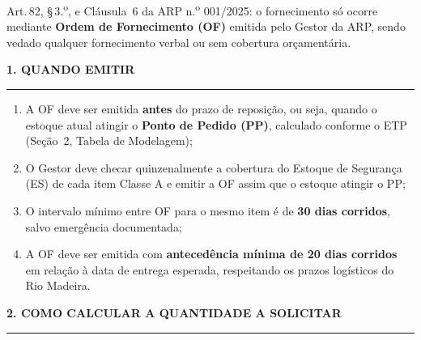 \documentclass[12pt,a4paper]{article}
\newcommand{\blank}[1]{\underline{\hspace{#1}}}
\newcommand{\arpRef}{ARP n.\textsuperscript{o} 001/2025}
\begin{document}
\vspace{0.4cm}
\begin{legalbox}[Fundamento]
\small Art.\,82, \S\,3.\textsuperscript{o}, e Cláusula~6 da \arpRef:
o fornecimento só ocorre mediante \textbf{Ordem de Fornecimento (OF)} emitida
pelo Gestor da ARP, sendo vedado qualquer fornecimento verbal ou sem cobertura
orçamentária.
\end{legalbox}

\vspace{0.5cm}
{\color{navy}\bfseries\normalsize 1. QUANDO EMITIR}\\[6pt]
\textcolor{navy!20}{\rule{\linewidth}{0.4pt}}

\begin{enumerate}
  \item A OF deve ser emitida \textbf{antes} do prazo de reposição, ou seja,
    quando o estoque atual atingir o \textbf{Ponto de Pedido (PP)}, calculado
    conforme o ETP \blank{2cm} (Seção~2, Tabela de Modelagem);

  \item O Gestor deve checar quinzenalmente a cobertura do Estoque de Segurança
    (ES) de cada item Classe A e emitir a OF assim que o estoque atingir o PP;

  \item O intervalo mínimo entre OF para o mesmo item é de \textbf{30 dias
    corridos}, salvo emergência documentada;

  \item A OF deve ser emitida com \textbf{antecedência mínima de 20 dias corridos}
    em relação à data de entrega esperada, respeitando os prazos logísticos do
    Rio Madeira.
\end{enumerate}

\vspace{0.4cm}
{\color{navy}\bfseries\normalsize 2. COMO CALCULAR A QUANTIDADE A SOLICITAR}\\[6pt]
\textcolor{navy!20}{\rule{\linewidth}{0.4pt}}
\end{document}
